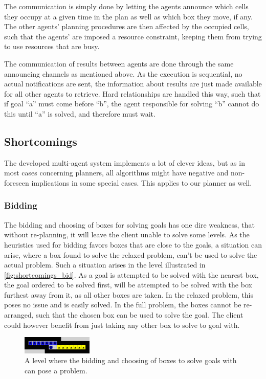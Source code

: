 \documentclass[Main]{subfiles}
\begin{document}
The communication is simply done by letting the agents announce which cells they
occupy at a given time in the plan as well as which box they move, if any. The
other agents' planning procedures are then affected by the occupied cells, such
that the agents' are imposed a resource constraint, keeping them from trying to
use resources that are busy. 

The communication of results between agents are done through the same announcing
channels as mentioned above. As the execution is sequential, no actual
notifications are sent, the information about results are just made available
for all other agents to retrieve. Hard relationships are handled this way, such
that if goal ``a'' must come before ``b'', the agent responsible for solving
``b'' cannot do this until ``a'' is solved, and therefore must wait. 

\subsection{Shortcomings}
\label{sec:shortcomings}
The developed multi-agent system implements a lot of clever ideas, but as in
most cases concerning planners, all algorithms might have negative and
non-foreseen implications in some special cases. This applies to our planner as
well. 

\subsubsection{Bidding}
The bidding and choosing of boxes for solving goals has one dire weakness, that
without re-planning, it will leave the client unable to solve some levels. As the
heuristics used for bidding favors boxes that are close to the goals, a
situation can arise, where a box found to solve the relaxed problem, can't be
used to solve the actual problem. Such a situation arises in the level
illustrated in \autoref{fig:shortcomings_bid}. As a goal is attempted to be solved
with the nearest box, the goal ordered to be solved first, will be attempted to
be solved with the box furthest away from it, as all other boxes are taken. In
the relaxed problem, this poses no issue and is easily solved. In the full
problem, the boxes cannot be re-arranged, such that the chosen box can be used
to solve the goal. The client could however benefit from just taking any other
box to solve to goal with. 

\begin{figure}[h!]
  \centering
  \includegraphics[width=0.3\textwidth]{shortcomings.png}
  \caption{A level where the bidding and choosing of boxes to solve goals with can pose a problem.}
  \label{fig:shortcomings_bid}
\end{figure}
\end{document}
